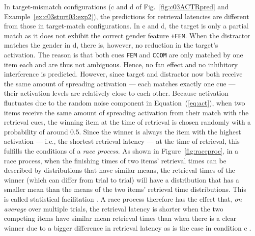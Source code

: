 \documentclass{cambridge7A}\usepackage[]{graphicx}\usepackage[]{color}
\newcommand{\actrcue}[1]{\texttt{\uppercase{#1}}}
\newcommand{\match}[1]{\texttt{+\uppercase{#1}}}
\begin{document}
In  target-mismatch configurations (c and d of Fig.~\ref{fig:c03ACTRpred} and Example~\ref{ex:c03sturt03:exp2}), the predictions for  retrieval latencies are different from those in  target-match configurations.
In c and d, the target is only a partial match as it does not exhibit the correct gender feature \match{fem}. When the distractor matches the gender in d, there is, however, no reduction in the target's activation. The reason is that both cues \actrcue{fem} and \actrcue{ccom} are only matched by one item each and are thus not ambiguous. Hence, no fan effect and no inhibitory interference is predicted.
However, since target and distractor now both receive the same amount of spreading activation --- each matches exactly one cue --- their activation levels are relatively close to each other. 
Because activation fluctuates due to the random noise component in Equation~(\ref{eq:act}), when two items receive the same amount of spreading activation from their match with the retrieval cues, the winning item at the time of retrieval is chosen randomly with a probability of around 0.5.
Since the winner is always the item with the highest activation --- i.e., the shortest retrieval latency --- at the time of retrieval, this fulfills the conditions of a  \emph{race process}. As shown in Figure~\ref{fig:raceproc}, in a race process, when the finishing times of two items' retrieval times can be described by distributions that have similar means, the retrieval times of the winner (which can differ from trial to trial) will have a distribution that has a smaller mean than the means of the two items' retrieval time distributions. This is called  statistical facilitation \citep{raab1962division}. A race process therefore has the effect that, \textit{on average} over multiple trials, the retrieval latency is shorter when the two competing items have similar mean retrieval times than when there is a clear winner due to a bigger difference in retrieval latency as is the case in condition c \citep[also see][]{LogacevVasishth2015}.
\end{document}
